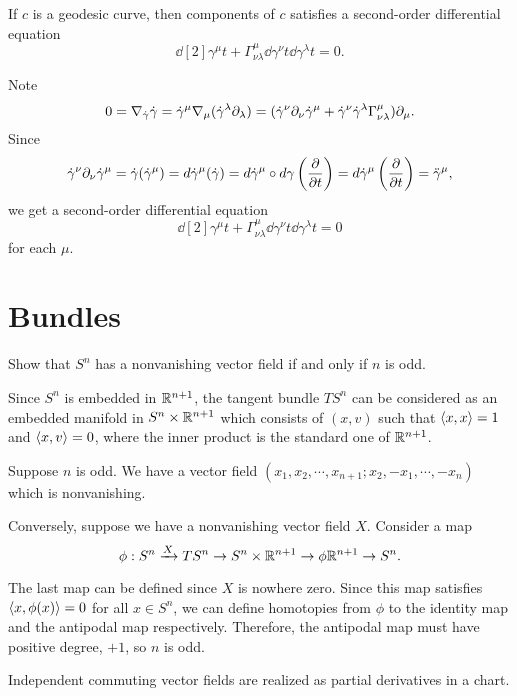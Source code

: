 \documentclass[a4paper]{article}
\begin{document}
\begin{thm}
If $c$ is a geodesic curve, then components of $c$ satisfies a second-order differential equation
\[\dd[2]{\gamma^\mu}{t}+\Gamma_{\nu\lambda}^\mu\dd{\gamma^\nu}{t}\dd{\gamma^\lambda}{t}=0.\]
\end{thm}
\begin{pf}
Note
\[0=\nabla_{\dot\gamma}\dot\gamma=\dot\gamma^\mu\nabla_\mu(\dot\gamma^\lambda\pd_\lambda)
=(\dot\gamma^\nu\pd_\nu\dot\gamma^\mu+\dot\gamma^\nu\dot\gamma^\lambda\Gamma_{\nu\lambda}^\mu)\pd_\mu.\]
Since
\[\dot\gamma^\nu\pd_\nu\dot\gamma^\mu=\dot\gamma(\dot\gamma^\mu)=d\dot\gamma^\mu(\dot\gamma)=d\dot\gamma^\mu\circ d\gamma\left(\pd{t}\right)=d\dot\gamma^\mu\left(\pd{t}\right)=\ddot\gamma^\mu,\]
we get a second-order differential equation
\[\dd[2]{\gamma^\mu}{t}+\Gamma_{\nu\lambda}^\mu\dd{\gamma^\nu}{t}\dd{\gamma^\lambda}{t}=0\]
for each $\mu$.
\end{pf}





\section{Bundles}
Show that $S^n$ has a nonvanishing vector field if and only if $n$ is odd.
\begin{sol}
Since $S^n$ is embedded in $\mathbb{R}^{n+1}$, the tangent bundle $TS^n$ can be considered as an embedded manifold in $S^n\times\mathbb{R}^{n+1}$ which consists of $(x,v)$ such that $\langle x,x\rangle=1$ and $\langle x,v\rangle=0$, where the inner product is the standard one of $\mathbb{R}^{n+1}$.

Suppose $n$ is odd.
We have a vector field
$(x_1,x_2,\cdots,x_{n+1};x_2,-x_1,\cdots,-x_n)$
which is nonvanishing.

Conversely, suppose we have a nonvanishing vector field $X$.
Consider a map
\[\phi:S^n\xrightarrow{X}TS^n\to S^n\times\mathbb{R}^{n+1}\to{\phi}\mathbb{R}^{n+1}\to S^n.\]

The last map can be defined since $X$ is nowhere zero. Since this map satisfies $\langle x,\phi(x)\rangle=0$ for all $x\in S^n$, we can define homotopies from $\phi$ to the identity map and the antipodal map respectively. Therefore, the antipodal map must have positive degree, $+1$, so $n$ is odd.
\end{sol}


\begin{prop}
Independent commuting vector fields are realized as partial derivatives in a chart.
\end{prop}
\end{document}

